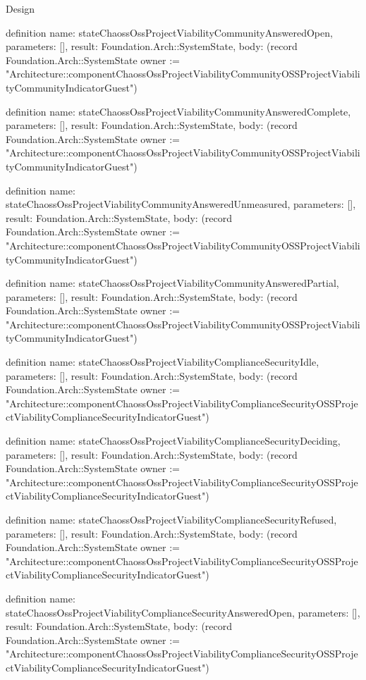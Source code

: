 \begin{lexlean}{Design}
\begin{semanticmodule}
definition{
  name: stateChaossOssProjectViabilityCommunityAnsweredOpen,
  parameters: [],
  result: Foundation.Arch::SystemState,
  body: (record Foundation.Arch::SystemState {owner := "Architecture::componentChaossOssProjectViabilityCommunityOSSProjectViabilityCommunityIndicatorGuest"})
}

definition{
  name: stateChaossOssProjectViabilityCommunityAnsweredComplete,
  parameters: [],
  result: Foundation.Arch::SystemState,
  body: (record Foundation.Arch::SystemState {owner := "Architecture::componentChaossOssProjectViabilityCommunityOSSProjectViabilityCommunityIndicatorGuest"})
}

definition{
  name: stateChaossOssProjectViabilityCommunityAnsweredUnmeasured,
  parameters: [],
  result: Foundation.Arch::SystemState,
  body: (record Foundation.Arch::SystemState {owner := "Architecture::componentChaossOssProjectViabilityCommunityOSSProjectViabilityCommunityIndicatorGuest"})
}

definition{
  name: stateChaossOssProjectViabilityCommunityAnsweredPartial,
  parameters: [],
  result: Foundation.Arch::SystemState,
  body: (record Foundation.Arch::SystemState {owner := "Architecture::componentChaossOssProjectViabilityCommunityOSSProjectViabilityCommunityIndicatorGuest"})
}

definition{
  name: stateChaossOssProjectViabilityComplianceSecurityIdle,
  parameters: [],
  result: Foundation.Arch::SystemState,
  body: (record Foundation.Arch::SystemState {owner := "Architecture::componentChaossOssProjectViabilityComplianceSecurityOSSProjectViabilityComplianceSecurityIndicatorGuest"})
}

definition{
  name: stateChaossOssProjectViabilityComplianceSecurityDeciding,
  parameters: [],
  result: Foundation.Arch::SystemState,
  body: (record Foundation.Arch::SystemState {owner := "Architecture::componentChaossOssProjectViabilityComplianceSecurityOSSProjectViabilityComplianceSecurityIndicatorGuest"})
}

definition{
  name: stateChaossOssProjectViabilityComplianceSecurityRefused,
  parameters: [],
  result: Foundation.Arch::SystemState,
  body: (record Foundation.Arch::SystemState {owner := "Architecture::componentChaossOssProjectViabilityComplianceSecurityOSSProjectViabilityComplianceSecurityIndicatorGuest"})
}

definition{
  name: stateChaossOssProjectViabilityComplianceSecurityAnsweredOpen,
  parameters: [],
  result: Foundation.Arch::SystemState,
  body: (record Foundation.Arch::SystemState {owner := "Architecture::componentChaossOssProjectViabilityComplianceSecurityOSSProjectViabilityComplianceSecurityIndicatorGuest"})
}


\end{semanticmodule}
\end{lexlean}

